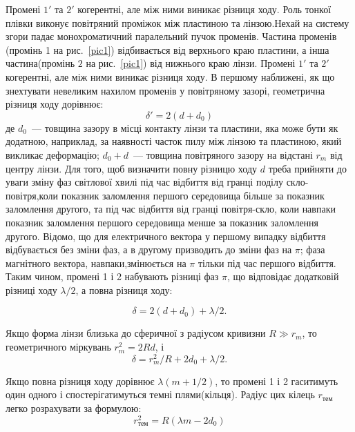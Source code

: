 Промені $1'$ та $2'$ когерентні,  але між ними виникає різниця ходу. Роль тонкої плівки виконує повітряний проміжок між пластиною та лінзою.Нехай на систему згори  падає монохроматичний паралельний пучок променів. Частина променів (промінь 1 на рис.~\ref{pic1}) відбивається від верхнього краю пластини, а інша частина(промінь $2$ на рис.~\ref{pic1}) від нижнього краю лінзи. Промені $1'$ та $2'$ когерентні,  але між ними виникає різниця ходу. В першому наближені, як що знехтувати невеликим нахилом променів у повітряному зазорі, геометрична різниця ходу дорівнює:
\begin{equation}
\delta' =2(d+d_{0})
\end{equation}
де $d_{0}$~--- товщина зазору в місці контакту лінзи та пластини, яка може бути як додатною, наприклад, за наявності часток пилу між лінзою та пластиною, який викликає деформацію; $d_{0}+d$~--- товщина повітряного зазору на відстані $r_m$ від центру лінзи. Для того, щоб визначити повну  різницю ходу $d$  треба прийняти до уваги зміну фаз світлової хвилі під час відбиття від гранці поділу скло-повітря,коли показник заломлення першого середовища більше за показник заломлення другого, та під час відбиття від гранці повітря-скло, коли навпаки показник заломлення першого середовища менше за показник заломлення другого. Відомо, що для електричного вектора у першому випадку відбиття відбувається  без зміни фаз, а в другому призводить до зміни  фаз на $\pi$; фаза магнітного вектора, навпаки,змінюється на $\pi$ тільки під час першого відбиття. Таким чином, промені 1 і 2 набувають різниці фаз $\pi$, що відповідає додатковій різниці ходу $\lambda/2$, а повна різниця ходу:

\begin{equation}
\delta =2(d+d_{0})+\lambda/2.
\end{equation}

Якщо форма лінзи близька до сферичної з радіусом кривизни $R \gg r_m$, то геометричного міркувань $r^2_m = 2Rd $, і 
\begin{equation}
\delta=r^2_m/R+2d_{0}+\lambda/2.
\end{equation}

Якщо повна різниця ходу дорівнює $\lambda(m+1/2)$, то промені 1 і 2 гаситимуть один одного і спостерігатимуться темні плями(кільця). Радіус цих кілець $r_\text{тем}$ легко розрахувати за формулою:
\begin{equation}
\label{rdark}
r_\text{тем}^2=R(\lambda m-2d_{0})
\end{equation}

